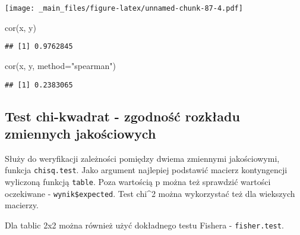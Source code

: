 \documentclass[
]{book}
\newenvironment{Shaded}{\begin{snugshade}}{\end{snugshade}}
\newcommand{\AttributeTok}[1]{\textcolor[rgb]{0.77,0.63,0.00}{#1}}
\newcommand{\FunctionTok}[1]{\textcolor[rgb]{0.00,0.00,0.00}{#1}}
\newcommand{\NormalTok}[1]{#1}
\newcommand{\StringTok}[1]{\textcolor[rgb]{0.31,0.60,0.02}{#1}}
\begin{document}
\texttt{[image: \_main\_files/figure-latex/unnamed-chunk-87-4.pdf]}

\begin{Shaded}
\begin{Highlighting}[]
\FunctionTok{cor}\NormalTok{(x, y)}
\end{Highlighting}
\end{Shaded}

\begin{verbatim}
## [1] 0.9762845
\end{verbatim}

\begin{Shaded}
\begin{Highlighting}[]
\FunctionTok{cor}\NormalTok{(x, y, }\AttributeTok{method=}\StringTok{"spearman"}\NormalTok{)}
\end{Highlighting}
\end{Shaded}

\begin{verbatim}
## [1] 0.2383065
\end{verbatim}

\hypertarget{test-chi-kwadrat---zgodnoux15bux107-rozkux142adu-zmiennych-jakoux15bciowych}{%
\subsection{Test chi-kwadrat - zgodność rozkładu zmiennych jakościowych}\label{test-chi-kwadrat---zgodnoux15bux107-rozkux142adu-zmiennych-jakoux15bciowych}}

Służy do weryfikacji zależności pomiędzy dwiema zmiennymi jakościowymi, funkcja \texttt{chisq.test}. Jako argument najlepiej podstawić macierz kontyngencji wyliczoną funkcją \texttt{table}. Poza wartością p można też sprawdzić wartości oczekiwane - \texttt{wynik\$expected}. Test chi\^{}2 można wykorzystać też dla wiekszych macierzy.

Dla tablic 2x2 można również użyć dokładnego testu Fishera - \texttt{fisher.test}.
\end{document}
